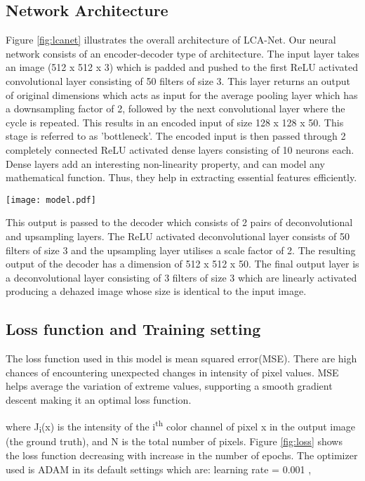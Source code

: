 \documentclass[conference]{IEEEtran}
\begin{document}
\subsection{    Network Architecture}\label{AA}
Figure \ref{fig:lcanet} illustrates the overall architecture of LCA-Net. Our neural network consists of an encoder-decoder type of architecture. The input layer takes an image (512 x 512 x 3) which is padded and pushed to the first ReLU \cite{maas2013rectifier} activated convolutional layer consisting of 50 filters of size 3. This layer returns an output of original dimensions which acts as input for the average pooling layer which has a downsampling factor of 2, followed by the next convolutional layer where the cycle is repeated. This results in an encoded input of size 128 x 128 x 50.
This stage is referred to as 'bottleneck'. The encoded input is then passed through 2 completely connected ReLU \cite{maas2013rectifier} activated dense layers consisting of 10 neurons each. Dense layers add an interesting non-linearity property, and can model any mathematical function. Thus, they help in extracting essential features efficiently.
\begin{figure*}[ht]
\captionsetup{justification=centering}
\centerline{\texttt{[image: model.pdf]}}
\caption{The architecture of LCA-Net}
\label{fig:lcanet}
\end{figure*}
This output is passed to the decoder which consists of 2 pairs of deconvolutional and upsampling layers. The ReLU\cite{maas2013rectifier} activated deconvolutional layer consists of 50 filters of size 3 and the upsampling layer utilises a scale factor of 2.
The resulting output of the decoder has a dimension of 512 x 512 x 50. The final output layer is a deconvolutional layer consisting of 3 filters of size 3 which are linearly activated producing a dehazed image whose size is identical to the input image.

\subsection{    Loss function and Training setting}
The loss function used in this model is mean squared error(MSE). There are high chances of encountering unexpected changes in intensity of pixel values. MSE helps average the variation of extreme values, supporting a smooth gradient descent making it an optimal loss function. 


where J\textsubscript{i}(x) is the intensity of the i\textsuperscript{th} color channel of pixel x in the output image (the ground truth), and N is the total number of pixels. Figure \ref{fig:loss} shows the loss function decreasing with increase in the number of epochs.
\newline
The optimizer used is ADAM \cite{kingma2014adam} in its default settings which are: learning rate = 0.001 , 
 
\end{document}
